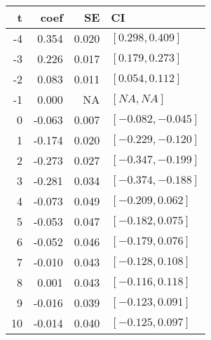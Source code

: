 
\begin{tabular}[t]{rrrl}
\toprule
t & coef & SE & CI\\
\midrule
-4 & 0.354 & 0.020 & $[0.298 , 0.409]$\\
-3 & 0.226 & 0.017 & $[0.179 , 0.273]$\\
-2 & 0.083 & 0.011 & $[0.054 , 0.112]$\\
-1 & 0.000 & NA & $[NA , NA]$\\
0 & -0.063 & 0.007 & $[-0.082 , -0.045]$\\
1 & -0.174 & 0.020 & $[-0.229 , -0.120]$\\
2 & -0.273 & 0.027 & $[-0.347 , -0.199]$\\
3 & -0.281 & 0.034 & $[-0.374 , -0.188]$\\
4 & -0.073 & 0.049 & $[-0.209 , 0.062]$\\
5 & -0.053 & 0.047 & $[-0.182 , 0.075]$\\
6 & -0.052 & 0.046 & $[-0.179 , 0.076]$\\
7 & -0.010 & 0.043 & $[-0.128 , 0.108]$\\
8 & 0.001 & 0.043 & $[-0.116 , 0.118]$\\
9 & -0.016 & 0.039 & $[-0.123 , 0.091]$\\
10 & -0.014 & 0.040 & $[-0.125 , 0.097]$\\
\bottomrule
\end{tabular}
